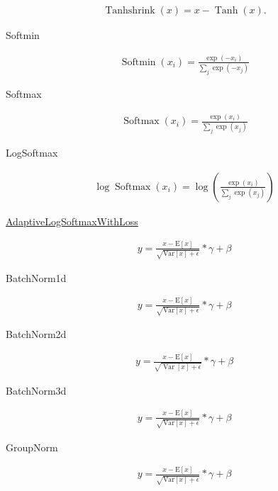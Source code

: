 \begin{align}
  \operatorname{Tanhshrink} (x)=x- \operatorname{Tanh} (x).
\end{align}

Softmin

\begin{align}
 \operatorname{Softmin}\left(x_{i}\right)=\frac{\exp \left(-x_{i}\right)}{\sum_{j} \exp \left(-x_{j}\right)}
\end{align}

Softmax

\begin{align}
  \operatorname{Softmax}\left(x_{i}\right)=\frac{\exp \left(x_{i}\right)}{\sum_{j} \exp \left(x_{j}\right)}
\end{align}

LogSoftmax

\begin{align}
  \log \operatorname{Softmax}\left(x_{i}\right)=\log \left(\frac{\exp \left(x_{i}\right)}{\sum_{j} \exp \left(x_{j}\right)}\right)
\end{align}


\href{https://pytorch.org/docs/stable/nn.html#torch.nn.Softshrink}{AdaptiveLogSoftmaxWithLoss}

\begin{align}
  y=\frac{x-\mathrm{E}[x]}{\sqrt{\mathrm{Var}[x]+\epsilon}} * \gamma+\beta
\end{align}

BatchNorm1d

\begin{align}
y=\frac{x-\mathrm{E}[x]}{\sqrt{\mathrm{Var}[x]+\epsilon}} * \gamma+\beta
\end{align}

BatchNorm2d

\begin{align}
  y=\frac{x-\mathrm{E}[x]}{\sqrt{\operatorname{Var}[x]+\epsilon}} * \gamma+\beta
\end{align}

BatchNorm3d

\begin{align}
  y=\frac{x-\mathrm{E}[x]}{\sqrt{\mathrm{Var}[x]+\epsilon}} * \gamma+\beta
\end{align}


GroupNorm

\begin{align}
  y=\frac{x-\mathrm{E}[x]}{\sqrt{\mathrm{Var}[x]+\epsilon}} * \gamma+\beta
\end{align}

